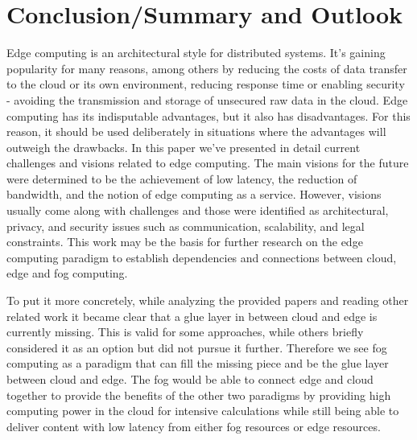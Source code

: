 \section{Conclusion/Summary and Outlook}\label{sec:conclusions}


Edge computing is an architectural style for distributed systems. It's gaining popularity for many reasons, among others by reducing the costs of data transfer to the cloud or its own environment, reducing response time or enabling security - avoiding the transmission and storage of unsecured raw data in the cloud. Edge computing has its indisputable advantages, but it also has disadvantages. For this reason, it should be used deliberately in situations where the advantages will outweigh the drawbacks. In this paper we've presented in detail current challenges and visions related to edge computing. The main visions for the future were determined to be the achievement of low latency, the reduction of bandwidth, and the notion of edge computing as a service. However, visions usually come along with challenges and those were identified as architectural, privacy, and security issues such as communication, scalability, and legal constraints. This work may be the basis for further research on the edge computing paradigm to establish dependencies and connections between cloud, edge and fog computing.

To put it more concretely, while analyzing the provided papers and reading other related work it became clear that a glue layer in between cloud and edge is currently missing. This is valid for some approaches, while others briefly considered it as an option but did not pursue it further.
Therefore we see fog computing as a paradigm that can fill the missing piece and be the glue layer between cloud and edge.
The fog would be able to connect edge and cloud together to provide the benefits of the other two paradigms by providing high computing power in the cloud for intensive calculations while still being able to deliver content with low latency from either fog resources or edge resources.


